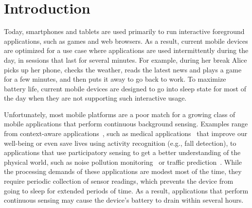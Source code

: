
\section{\label{sec:Introduction}Introduction}

Today, smartphones and tablets are used primarily to run interactive
foreground applications, such as games and web browsers.  As a result,
current mobile devices are optimized for a use case where applications
are used intermittently during the day, in sessions that last for
several minutes.  For example, during her break Alice picks up
her phone, checks the weather, reads the latest news and plays a
game for a few minutes, and then puts it away to go back to work.  To
maximize battery life, current mobile devices are designed to go
into sleep state for most of the day when they are not supporting such
interactive usage.

Unfortunately, most mobile platforms are a poor match for a growing
class of mobile applications that perform continuous background
sensing.  Examples range from context-aware applications~\cite{baldauf2007survey,hong2009context}, such as
medical applications~\cite{hameed2003application,preuveneers2008mobile,tsai2007usability} that improve our
well-being or even save lives using activity recognition (e.g., fall
detection), to applications that use participatory sensing to get a
better understanding of the physical world, such as noise pollution
monitoring~\cite{maisonneuve2009citizen,maisonneuve2009noisetube} or 
traffic prediction~\cite{hull2006cartel}.  While the processing demands of
these applications are modest most of the time, they require periodic
collection of sensor readings, which prevents the device from going to
sleep for extended periods of time.  As a result, applications that
perform continuous sensing may cause the device's battery to drain
within several hours.

